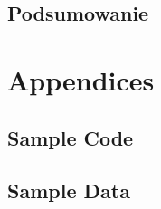 \documentclass[runningheads,12pt]{llncs}
\begin{document}
\subsection{Podsumowanie}

\nocite{*}

\listoftables

\listoffigures




\section{Appendices}

\subsection{Sample Code}
\subsection{Sample Data}
\end{document}
